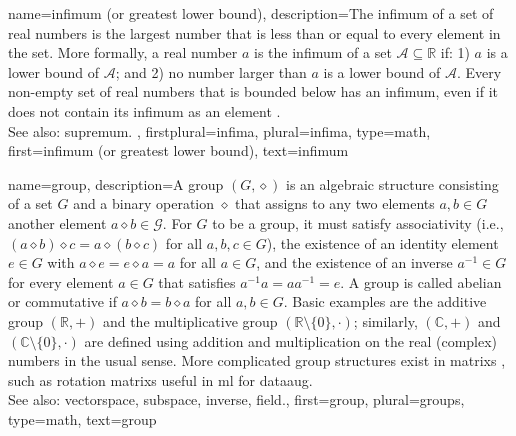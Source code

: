 {name={infimum (or greatest lower bound)},
	description={The infimum of a set of 
		real numbers is the largest number that is less than or equal 
		to every element in the set. More formally, a real number $a$ is 
		the infimum of a set $\mathcal{A} \subseteq \mathbb{R}$ if: 1) $a$ 
		is a lower bound of $\mathcal{A}$; and 2) no number larger than 
		$a$ is a lower bound of $\mathcal{A}$. Every non-empty set of real 
		numbers that is bounded below has an infimum, even if it does 
		not contain its infimum as an element \cite[Sec.~1.4]{RudinBookPrinciplesMatheAnalysis}.
		\\
		See also: \gls{supremum}. },
	firstplural={infima}, 
  	plural={infima},
	type=math, 
	first={infimum (or greatest lower bound)},
	text={infimum}
}

{name={group},
	description={A group $(G, \diamond)$ is an algebraic structure \cite[Ch.~1]{artin2016geometric} 
		consisting of a set $G$ and a binary operation $\diamond$ that assigns to any two elements $a, b \in G$ 
		another element $a \diamond b \in \mathcal{G}$. For $G$ to be a group, it must satisfy associativity 
		(i.e., $(a \diamond b) \diamond c = a \diamond (b \diamond c)$ for all $a,b,c \in G$), 
		the existence of an identity element $e \in G$ with $a \diamond e = e \diamond a = a$ for all $a \in G$, 
		and the existence of an inverse $a^{-1} \in G$ for every element $a \in G$ that satisfies $a^{-1} a = a a^{-1} = e$. 
		A group is called abelian or commutative if $a \diamond b = b \diamond a$ for all $a, b \in G$. 
		Basic examples are the additive group $(\mathbb{R}, +)$ and the multiplicative group 
		$(\mathbb{R}\setminus \{0\}, \cdot)$; similarly, $(\mathbb{C}, +)$ and $(\mathbb{C}\setminus \{0\}, \cdot)$ 
		are defined using addition and multiplication on the real (complex) numbers in the usual sense. 
		More complicated group structures exist in \glspl{matrix} \cite{artin2016geometric}, such as rotation \glspl{matrix} 
		useful in \gls{ml} for \gls{dataaug}.
		\\
		See also: \gls{vectorspace}, \gls{subspace}, \gls{inverse}, \gls{field}.},
	first={group},
	plural={groups},
	type=math,
	text={group}
}

